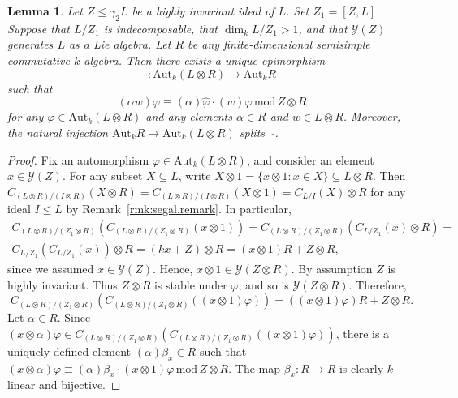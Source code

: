 \documentclass[11pt,a4paper]{amsart}
\theoremstyle{plain}
\newtheorem{lemma}[thm]{Lemma}
\theoremstyle{remark}
\newcommand{\tensor}{\otimes}
\begin{document}
\begin{lemma} \label{lem:rigidity1}
Let $Z \leq \gamma_2 L$ be a highly invariant ideal of $L$.  Set $Z_1 = [Z,L]$.
Suppose that $L/Z_1$ is indecomposable, that $\dim_{k} L / Z_1 > 1$, and that $\mathcal{Y}(Z)$ generates $L$ as a Lie algebra.  Let $R$ be any finite-dimensional semisimple commutative $k$-algebra.  Then there exists a unique epimorphism 
$$ \widehat{} : \mathrm{Aut}_k (L \otimes R) \to \mathrm{Aut}_k R$$
such that
$$  (\alpha w)\varphi \equiv (\alpha)\widehat{\varphi} \cdot (w)\varphi   \, \mathrm{mod} \, Z \otimes R$$
for any $\varphi \in \mathrm{Aut}_k (L \otimes R)$ and any elements $\alpha \in R$ and $w \in L \otimes R$.  Moreover, the natural injection $\mathrm{Aut}_k R \to \mathrm{Aut}_k (L \otimes R)$ splits \, $\widehat{}$.
\end{lemma}
\begin{proof}
Fix an automorphism $\varphi \in  \mathrm{Aut}_k (L \otimes R)$, and consider an element $x \in \mathcal{Y}(Z)$.  For any subset $X \subseteq L$, write $X \tensor 1 = \{ x \tensor 1: x \in X \} \subseteq L \tensor R$.  Then
$C_{(L \otimes R)/(I \otimes R)} (X \tensor R) = C_{(L \otimes R)/(I \otimes R)} (X \tensor 1) = C_{L/I}(X) \otimes R$
for any ideal $I \leq L$ by Remark~\ref{rmk:segal.remark}.  
In particular,
\begin{multline*} 
C_{(L \otimes R)/(Z_1 \otimes R)} (C_{(L \otimes R)/(Z_1 \otimes R)} (x \otimes 1)) =  C_{(L \otimes R)/(Z_1 \otimes R)} (C_{L / Z_1} (x) \tensor R) = \\  C_{L / Z_1} (C_{L / Z_1} (x)) \otimes R = (kx + Z) \otimes R = (x \otimes 1)R + Z \otimes R,
\end{multline*}
since we assumed $x \in \mathcal{Y}(Z)$.  Hence, $x \tensor 1 \in \mathcal{Y}(Z \tensor R)$.  
By assumption $Z$ is highly invariant.  Thus $Z \otimes R$ is stable under $\varphi$, and so is $\mathcal{Y}(Z \tensor R)$.  Therefore,
$$ C_{(L \otimes R)/(Z_1 \otimes R)} (C_{(L \otimes R)/(Z_1 \otimes R)} ((x \otimes 1)\varphi)) = ((x \otimes 1)\varphi)R + Z \otimes R.$$
Let $\alpha \in R$.  Since $(x \otimes \alpha)\varphi \in C_{(L \otimes R)/(Z_1 \otimes R)} (C_{(L \otimes R)/(Z_1 \otimes R)} ((x \otimes 1)\varphi))$, there is a uniquely defined element $(\alpha)\beta_x \in R$ such that $(x \otimes \alpha)\varphi \equiv (\alpha)\beta_x \cdot (x \otimes 1)\varphi \, \mathrm{mod} \, Z \otimes R$.  
The map $\beta_x : R \to R$ is clearly $k$-linear and bijective.


\end{proof}
\end{document}
